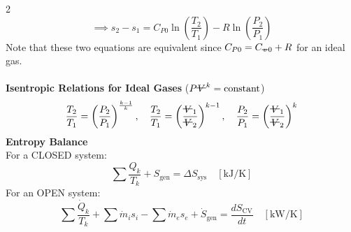 \documentclass[10pt, fleqn]{article}
\newcommand{\vol}{\mathord{\text{\ooalign{\hidewidth $V$\hidewidth\cr\kern-0.5pt\raisebox{0.8ex}{\rule[0pt]{1em}{0.5pt}}}}}}
\newcommand{\svol}{%
  \mathord{\text{\ooalign{%
    \hfil$v$\hfil\cr
    \hfil\rule[0.6ex]{0.8em}{0.5pt}\hfil
  }}}%
}
\begin{document}
\begin{multicols}{2}
\[\implies s_2-s_1 = C_{P0}\ln\left(\frac{T_2}{T_1}\right)-R \ln\left(\frac{P_2}{P_1}\right)\]
Note that these two equations are equivalent since $C_{P0} = C_{\svol0} + R$ for an ideal gas.\\\\
\textbf{Isentropic Relations for Ideal Gases} ($P\vol^k = \text{constant}$)
\[\frac{T_2}{T_1} = \left(\frac{P_2}{P_1}\right)^{\frac{k-1}{k}}, \quad \frac{T_2}{T_1} = \left(\frac{\vol_1}{\vol_2}\right)^{k-1},\quad \frac{P_2}{P_1} = \left(\frac{\vol_1}{\vol_2}\right)^k\]
\textbf{Entropy Balance}\\
For a CLOSED system:
\[\sum \frac{Q_k}{T_k}+S_{\text{gen}}=\Delta S_{\text{sys}} \quad [\text{kJ/K}]\]
For an OPEN system:
\[\sum \frac{\dot{Q}_k}{T_k} +\sum \dot{m}_i s_i - \sum \dot{m}_e s_e + \dot{S}_\text{gen} = \frac{dS_\text{CV}}{dt} \quad [\text{kW/K}]\]

\end{multicols}
\end{document}
